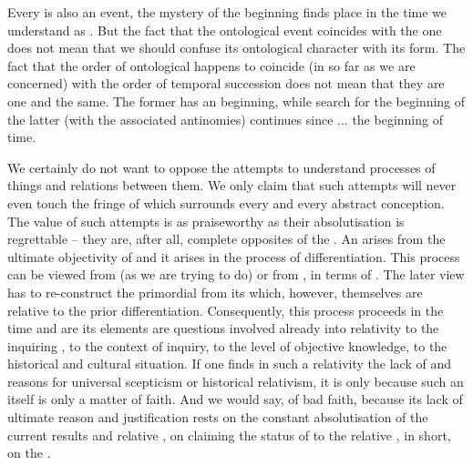 Every  is also an  event, the mystery of the beginning
finds place in the time we understand as . But the fact
that the ontological event coincides with the  one does not mean that
we should confuse its ontological character with its  form.  The
fact that the order of ontological  happens to coincide (in so far
as we are concerned) with the order of temporal succession does not mean that they are one and the same. The former has an
 beginning, while search for the beginning of the latter (with the
associated antinomies) continues since ... the beginning of time.

We certainly do not want to oppose the attempts to understand 
processes of  things and relations between them. We only claim that
such attempts will never even touch the fringe of  which
surrounds every  and every abstract conception. The value
of such attempts is as praiseworthy as their absolutisation is regrettable --
they are, after all, complete opposites of the . An 
arises from the ultimate objectivity of  and it arises in the
process of differentiation. This process can be viewed from  (as we
are trying to do) or from , in terms of . The
later view has to re-construct the primordial  from its
 which, however, themselves are relative to the prior
differentiation. Consequently,  this process proceeds in the
 time and  are its  elements are questions
involved already into relativity to the inquiring , to the context
of inquiry, to the level of objective knowledge, to the historical and cultural
situation.  If one finds in such a relativity the lack of  and
reasons for universal scepticism or historical relativism, it is only because
such an  itself is only a matter of faith. And we would say, of
bad faith, because its lack of ultimate reason and justification rests on the
constant absolutisation of the current results and relative , on
claiming the status of  to the relative , in short,
on the .

